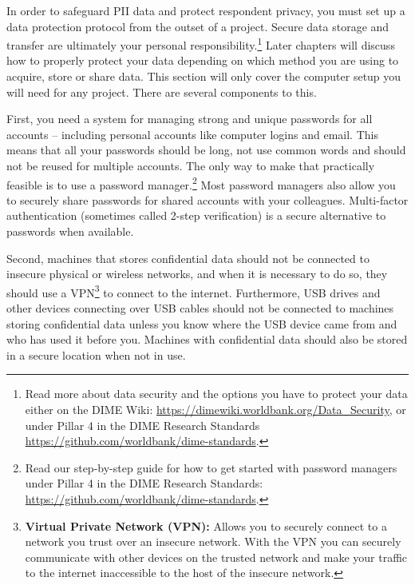 \documentclass[
]{book}
\begin{document}
In order to safeguard PII data and protect respondent privacy,
you must set up a data protection protocol from the outset of a project.
Secure data storage and transfer are ultimately your personal responsibility.\footnote{Read more about data security and the options you have to protect your data
  either on the DIME Wiki:
  \url{https://dimewiki.worldbank.org/Data_Security},
  or under Pillar 4 in the DIME Research Standards
  \url{https://github.com/worldbank/dime-standards}.}
Later chapters will discuss how to properly protect your data depending on
which method you are using to acquire, store or share data.
This section will only cover the computer setup you will need for any project.
There are several components to this.

First, you need a system for managing strong and unique passwords for
all accounts -- including personal accounts like computer logins and email.
This means that all your passwords should be long,
not use common words and should not be reused for multiple accounts.
The only way to make that practically feasible is to use a password manager.\footnote{Read our step-by-step guide for how to get started with password managers
  under Pillar 4 in the DIME Research Standards:
  \url{https://github.com/worldbank/dime-standards}.}
Most password managers also allow you to securely share passwords
for shared accounts with your colleagues.
Multi-factor authentication (sometimes called 2-step verification)
is a secure alternative to passwords when available.

Second, machines that stores confidential data
should not be connected to insecure physical or wireless networks,
and when it is necessary to do so,
they should use a VPN\footnote{\textbf{Virtual Private Network (VPN):}
  Allows you to securely connect to a network you trust over an insecure network.
  With the VPN you can securely communicate
  with other devices on the trusted network and
  make your traffic to the internet inaccessible
  to the host of the insecure network.}
to connect to the internet.
Furthermore, USB drives and other devices connecting over USB cables
should not be connected to machines storing confidential data
unless you know where the USB device came from
and who has used it before you.
Machines with confidential data should also
be stored in a secure location when not in use.
\end{document}

